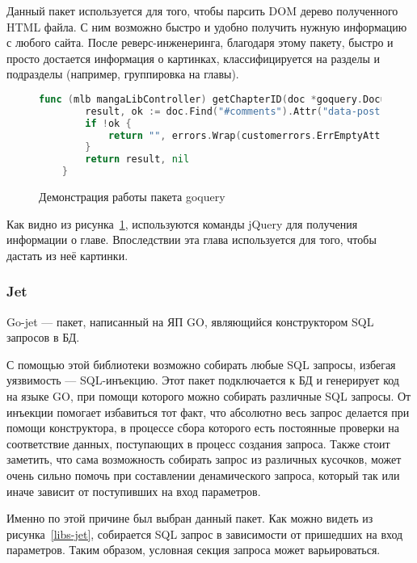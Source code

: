 Данный пакет используется для того, чтобы парсить DOM дерево полученного HTML файла. С ним возможно быстро и удобно получить нужную информацию с любого сайта.
После реверс-инженеринга, благодаря этому пакету, быстро и просто достается информация о картинках, классифицируется на разделы и подразделы (например, группировка на главы).

\begin{figure}
	\begin{lstlisting}[language=go]
	func (mlb mangaLibController) getChapterID(doc *goquery.Document) (string, error) {
		result, ok := doc.Find("#comments").Attr("data-post-id")
		if !ok {
			return "", errors.Wrap(customerrors.ErrEmptyAttr, "mangalib: data-post-id")
		}
		return result, nil
	}
	\end{lstlisting}
	\caption{Демонстрация работы пакета goquery}
	\label{libs-goquery}
\end{figure}

Как видно из рисунка~\ref{libs-goquery}, используются команды jQuery для получения информации о главе. 
Впоследствии эта глава используется для того, чтобы дастать из неё картинки.

\subsubsection{Jet} \label{jet-section}
Go-jet \cite{jet-cite} --- пакет, написанный на ЯП GO, являющийся конструктором SQL запросов в БД.

С помощью этой библиотеки возможно собирать любые SQL запросы, избегая уязвимость --- SQL-инъекцию. 
Этот пакет подключается к БД и генерирует код на языке GO, при помощи которого можно собирать различные SQL запросы.
От инъекции помогает избавиться тот факт, что абсолютно весь запрос делается при помощи конструктора, в процессе сбора которого есть постоянные проверки на соответствие данных,
поступающих в процесс создания запроса.
Также стоит заметить, что сама возможность собирать запрос из различных кусочков, может очень сильно помочь при составлении денамического запроса, который так или иначе зависит от поступивших на вход параметров.

Именно по этой причине был выбран данный пакет.
Как можно видеть из рисунка~\ref{libs-jet}, собирается SQL запрос в зависимости от пришедших на вход параметров. 
Таким образом, условная секция запроса может варьироваться.

